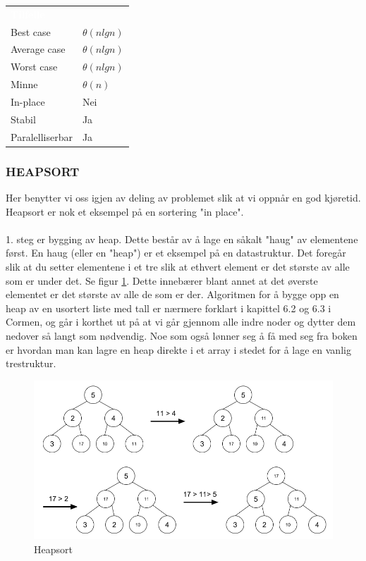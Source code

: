 \begin{table}[H]
    \label{tab:bubblesort}
    \centering
    \begin{tabular}{|L{15em} | L{15em}|}
        \hline
        \textbf{\textcolor{white}{Tilfelle}} & \textbf{\textcolor{white}{}}\\
        Best case & $\theta(n lg n)$\\
        Average case & $\theta(n lg n)$\\
        Worst case & $\theta(n lg n)$\\
        Minne & $\theta(n)$\\
        In-place & Nei\\
        Stabil & Ja\\
        Paralelliserbar & Ja\\
         \hline
    \end{tabular}
\end{table}

\subsubsection{HEAPSORT}
Her benytter vi oss igjen av deling av problemet slik at vi oppnår en god kjøretid. Heapsort er nok et eksempel på en sortering "in place".
\\\\
1. steg er bygging av heap. Dette består av å lage en såkalt "haug" av elementene først. En haug (eller en "heap") er et eksempel på en datastruktur. Det foregår slik at du setter elementene i et tre slik at ethvert element er det største av alle som er under det. Se figur \ref{fig:heapsort}. Dette innebærer blant annet at det øverste elementet er det største av alle de som er der. Algoritmen for å bygge opp en heap av en usortert liste med tall er nærmere forklart i kapittel 6.2 og 6.3 i Cormen, og går i korthet ut på at vi går gjennom alle indre noder og dytter dem nedover så langt som nødvendig. Noe som også lønner seg å få med seg fra boken er hvordan man kan lagre en heap direkte i et array i stedet for å lage en vanlig trestruktur.

\begin{figure}[H]
\includegraphics[scale=0.6]{images/heapsort}
\centering %
\caption{Heapsort}
\label{fig:heapsort}
\end{figure}


